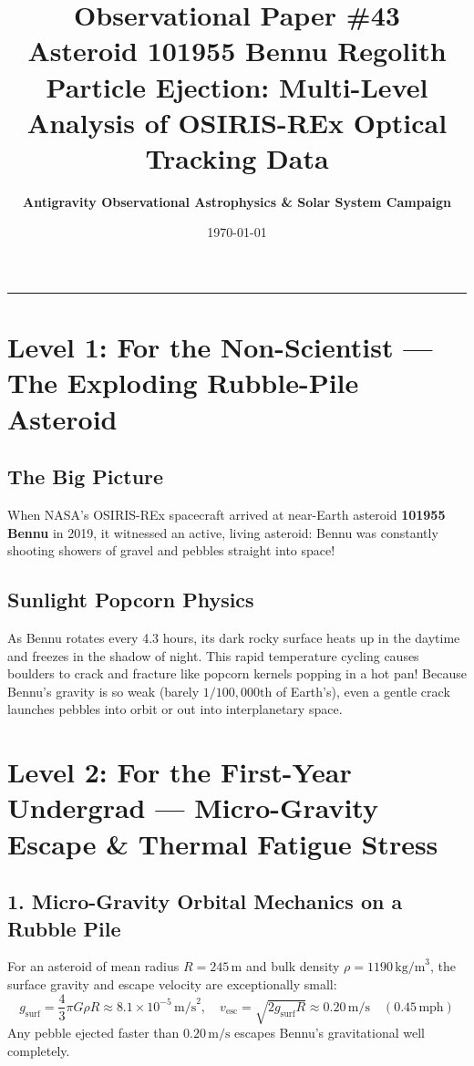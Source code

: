 \documentclass[11pt,a4paper]{article}
\title{\Huge \textbf{Observational Paper \#43}\\ \Large Asteroid 101955 Bennu Regolith Particle Ejection: Multi-Level Analysis of OSIRIS-REx Optical Tracking Data}
\author{\textbf{Antigravity Observational Astrophysics \& Solar System Campaign}}
\date{\today}
\begin{document}
\maketitle

\vspace{-1em}
\begin{center}
\rule{\textwidth}{1.5pt}
\end{center}

\section*{Level 1: For the Non-Scientist — The Exploding Rubble-Pile Asteroid}

\subsection*{The Big Picture}
When NASA's OSIRIS-REx spacecraft arrived at near-Earth asteroid \textbf{101955 Bennu} in 2019, it witnessed an active, living asteroid: Bennu was constantly shooting showers of gravel and pebbles straight into space!

\subsection*{Sunlight Popcorn Physics}
As Bennu rotates every 4.3 hours, its dark rocky surface heats up in the daytime and freezes in the shadow of night. This rapid temperature cycling causes boulders to crack and fracture like popcorn kernels popping in a hot pan! Because Bennu's gravity is so weak (barely $1/100,000\text{th}$ of Earth's), even a gentle crack launches pebbles into orbit or out into interplanetary space.

\newpage

\section*{Level 2: For the First-Year Undergrad — Micro-Gravity Escape \& Thermal Fatigue Stress}

\subsection*{1. Micro-Gravity Orbital Mechanics on a Rubble Pile}
For an asteroid of mean radius $R = 245\,\text{m}$ and bulk density $\rho = 1190\,\text{kg/m}^3$, the surface gravity and escape velocity are exceptionally small:
\begin{equation}
g_{\text{surf}} = \frac{4}{3} \pi G \rho R \approx 8.1 \times 10^{-5}\,\text{m/s}^2, \quad v_{\text{esc}} = \sqrt{2 g_{\text{surf}} R} \approx 0.20\,\text{m/s} \quad (0.45\,\text{mph})
\end{equation}
Any pebble ejected faster than $0.20\,\text{m/s}$ escapes Bennu's gravitational well completely.
\end{document}
